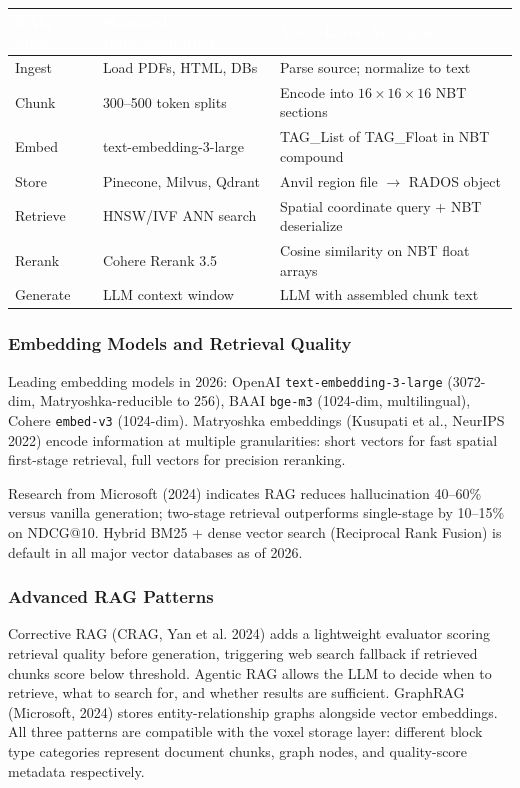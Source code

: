 \documentclass[11pt,letterpaper]{article}
\newcommand{\tableheader}[1]{\textbf{\sffamily\textcolor{white}{#1}}}
\begin{document}
\begin{center}
\begin{tabularx}{\textwidth}{L{2.5cm}L{3.5cm}X}
\toprule
{}
\tableheader{RAG Stage} & \tableheader{Standard Implementation} & \tableheader{Voxel-Layer Analogue} \\
\midrule
Ingest & Load PDFs, HTML, DBs & Parse source; normalize to text \\
Chunk & 300--500 token splits & Encode into $16\times16\times16$ NBT sections \\
Embed & text-embedding-3-large & TAG\_List of TAG\_Float in NBT compound \\
Store & Pinecone, Milvus, Qdrant & Anvil region file $\rightarrow$ RADOS object \\
Retrieve & HNSW/IVF ANN search & Spatial coordinate query + NBT deserialize \\
Rerank & Cohere Rerank 3.5 & Cosine similarity on NBT float arrays \\
Generate & LLM context window & LLM with assembled chunk text \\
\bottomrule
\end{tabularx}
\end{center}

\subsubsection{Embedding Models and Retrieval Quality}

Leading embedding models in 2026: OpenAI \texttt{text-embedding-3-large} (3072-dim, Matryoshka-reducible to 256), BAAI \texttt{bge-m3} (1024-dim, multilingual), Cohere \texttt{embed-v3} (1024-dim). Matryoshka embeddings (Kusupati et al., NeurIPS 2022) encode information at multiple granularities: short vectors for fast spatial first-stage retrieval, full vectors for precision reranking.

Research from Microsoft (2024) indicates RAG reduces hallucination 40--60\% versus vanilla generation; two-stage retrieval outperforms single-stage by 10--15\% on NDCG@10. Hybrid BM25 + dense vector search (Reciprocal Rank Fusion) is default in all major vector databases as of 2026.

\subsubsection{Advanced RAG Patterns}

Corrective RAG (CRAG, Yan et al. 2024) adds a lightweight evaluator scoring retrieval quality before generation, triggering web search fallback if retrieved chunks score below threshold. Agentic RAG allows the LLM to decide when to retrieve, what to search for, and whether results are sufficient. GraphRAG (Microsoft, 2024) stores entity-relationship graphs alongside vector embeddings. All three patterns are compatible with the voxel storage layer: different block type categories represent document chunks, graph nodes, and quality-score metadata respectively.
\end{document}
